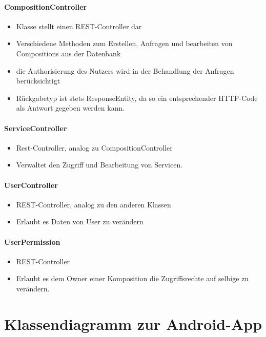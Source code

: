 \paragraph{CompositionController}
\begin{itemize}
	\item Klasse stellt einen REST-Controller dar
	\item Verschiedene Methoden zum Erstellen, Anfragen und bearbeiten von Compositions aus der Datenbank
	\item die Authorisierung des Nutzers wird in der Behandlung der Anfragen berücksichtigt
	\item Rückgabetyp ist stets ResponseEntity, da so ein entsprechender HTTP-Code als Antwort gegeben werden kann.
\end{itemize}
\paragraph{ServiceController}
\begin{itemize}
	\item Rest-Controller, analog zu CompositionController
	\item Verwaltet den Zugriff und Bearbeitung von Servicen.
\end{itemize}
\paragraph{UserController}
\begin{itemize}
	\item REST-Controller, analog zu den anderen Klassen
	\item Erlaubt es Daten von User zu verändern
\end{itemize}
\paragraph{UserPermission}
\begin{itemize}
	\item REST-Controller
	\item Erlaubt es dem Owner einer Komposition die Zugriffsrechte auf selbige zu verändern.
\end{itemize}

\newpage
\section*{Klassendiagramm zur Android-App}

